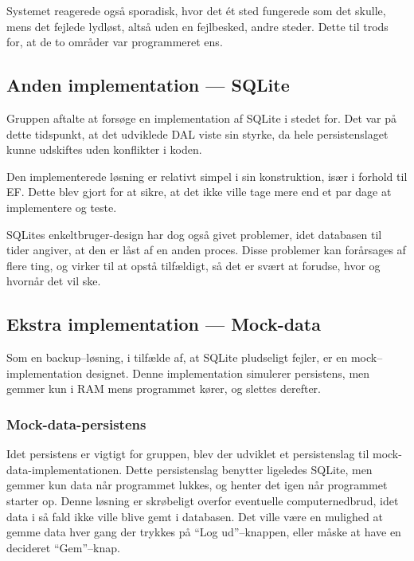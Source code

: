 Systemet reagerede også sporadisk, hvor det ét sted fungerede som det skulle, mens det fejlede lydløst, altså uden en fejlbesked, andre steder.
Dette til trods for, at de to områder var programmeret ens.

\subsection{Anden implementation --- SQLite}

Gruppen aftalte at forsøge en implementation af SQLite i stedet for.
Det var på dette tidspunkt, at det udviklede \acl{DAL} viste sin styrke, da hele persistenslaget kunne udskiftes uden konflikter i koden.

Den implementerede løsning er relativt simpel i sin konstruktion, især i forhold til \acl{EF}.
Dette blev gjort for at sikre, at det ikke ville tage mere end et par dage at implementere og teste.

SQLites enkeltbruger-design har dog også givet problemer, idet databasen til tider angiver, at den er låst af en anden proces.
Disse problemer kan forårsages af flere ting, og virker til at opstå tilfældigt, så det er svært at forudse, hvor og hvornår det vil ske.

\subsection{Ekstra implementation --- Mock-data}

Som en backup--løsning, i tilfælde af, at SQLite pludseligt fejler, er en mock--implementation designet.
Denne implementation simulerer persistens, men gemmer kun i RAM mens programmet kører, og slettes derefter.

\subsubsection*{Mock-data-persistens}

Idet persistens er vigtigt for gruppen, blev der udviklet et persistenslag til mock-data-implementationen.
Dette persistenslag benytter ligeledes SQLite, men gemmer kun data når programmet lukkes, og henter det igen når programmet starter op.
Denne løsning er skrøbeligt overfor eventuelle computernedbrud, idet data i så fald ikke ville blive gemt i databasen.
Det ville være en mulighed at gemme data hver gang der trykkes på ``Log ud''--knappen, eller måske at have en decideret ``Gem''--knap.


